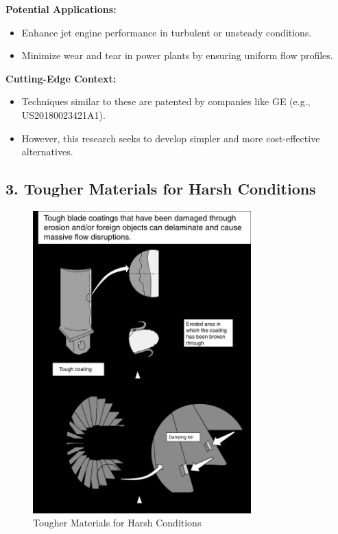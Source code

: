 \documentclass[12pt,a4paper]{article}
\begin{document}
\vspace{0.5em}

\textbf{Potential Applications:}
\begin{itemize}
    \item Enhance jet engine performance in turbulent or unsteady conditions.
    \item Minimize wear and tear in power plants by ensuring uniform flow profiles.
\end{itemize}

\textbf{Cutting-Edge Context:}
\begin{itemize}
    \item Techniques similar to these are patented by companies like GE (e.g., US20180023421A1).
    \item However, this research seeks to develop simpler and more cost-effective alternatives.
\end{itemize}











\subsection*{3. Tougher Materials for Harsh Conditions}

\begin{figure}[h!]
    \centering
    \includegraphics[width=0.75\textwidth]{image2.jpg}
    \caption{Tougher Materials for Harsh Conditions}
    \label{fig:comp_map}
\end{figure}
\end{document}
